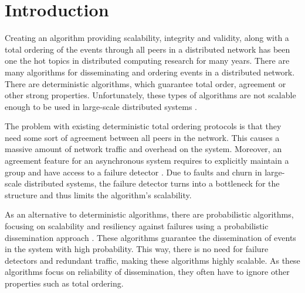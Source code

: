 \section{Introduction}

Creating an algorithm providing scalability, integrity and validity, along with a total ordering of the events through all peers in a distributed network has been one the hot topics in distributed computing research for many years. There are many algorithms for disseminating and ordering events in a distributed network. There are deterministic algorithms, which guarantee total order, agreement or other strong properties. Unfortunately, these types of algorithms are not scalable enough to be used in large-scale distributed systems \autocites[]{defago2004total}[]{lamport1978time}.
\par
The problem with existing deterministic total ordering protocols is that they need some sort of agreement between all peers in the network. This causes a massive amount of network traffic and overhead on the system.
Moreover, an agreement feature for an asynchronous system requires to
explicitly maintain a group and have access to a failure detector \autocites[]{chandra1996weakest}[]{chandra1996unreliable}. Due to faults and churn in large-scale distributed systems, the failure detector turns into a bottleneck for the structure and thus limits the algorithm's scalability.
\par
As an alternative to deterministic algorithms, there are probabilistic algorithms, focusing on scalability and resiliency against failures using a probabilistic dissemination approach  \autocite{birman1999bimodal,carvalho2007emergent,demers1987epidemic,eugster2003lightweight,felber2002probabilistic,hayden1996probabilistic,kim2004gossip,Koldehofe02simplegossiping}. These algorithms guarantee the dissemination of events in the system with high probability. This way, there is no need for failure detectors and redundant traffic, making these algorithms highly scalable. As these algorithms focus on reliability of dissemination, they often have to ignore other properties such as total ordering. 

